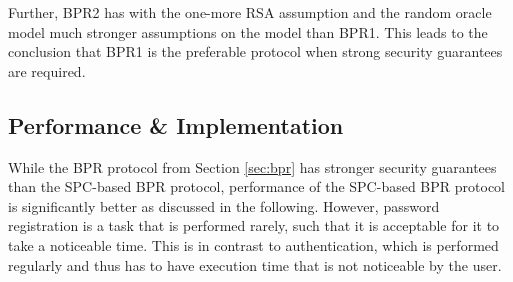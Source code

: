 Further, BPR2 has with the one-more RSA assumption and the random oracle model much stronger assumptions on the model than BPR1.
This leads to the conclusion that BPR1 is the preferable protocol when strong security guarantees are required.

\subsection{Performance \& Implementation} \label{sec:performance}

While the \ac{BPR} protocol from Section \ref{sec:bpr} has stronger security guarantees than the \ac{SPC}-based \ac{BPR} protocol, performance of the \ac{SPC}-based \ac{BPR} protocol is significantly better as discussed in the following.
However, password registration is a task that is performed rarely, such that it is acceptable for it to take a noticeable time. 
This is in contrast to authentication, which is performed regularly and thus has to have execution time that is not noticeable by the user.

